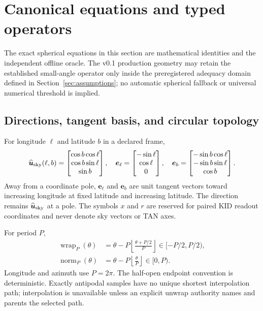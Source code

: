 \section{Canonical equations and typed operators}
\label{sec:equations}

The exact spherical equations in this section are mathematical identities and
the independent offline oracle.  The v0.1 production geometry may retain the
established small-angle operator only inside the preregistered adequacy domain
defined in Section~\ref{sec:assumptions}; no automatic spherical fallback or
universal numerical threshold is implied.

\subsection{Directions, tangent basis, and circular topology}

For longitude $\ell$ and latitude $b$ in a declared frame,
\begin{equation}
 \widehat{\boldsymbol u}_{\rm sky}(\ell,b)=
 \begin{bmatrix}\cos b\cos\ell\\ \cos b\sin\ell\\ \sin b\end{bmatrix},
 \quad
 \boldsymbol e_\ell=
 \begin{bmatrix}-\sin\ell\\ \cos\ell\\0\end{bmatrix},
 \quad
 \boldsymbol e_b=
 \begin{bmatrix}-\sin b\cos\ell\\-\sin b\sin\ell\\\cos b\end{bmatrix}.
 \label{eq:unit-basis}
\end{equation}
Away from a coordinate pole, $\boldsymbol e_\ell$ and $\boldsymbol e_b$ are
unit tangent vectors toward increasing longitude at fixed latitude and
increasing latitude.  The direction remains
$\widehat{\boldsymbol u}_{\rm sky}$ at a pole.  The symbols $x$ and $r$ are
reserved for paired KID readout coordinates and never denote sky vectors or
TAN axes.

For period $P$,
\begin{align}
 \operatorname{wrap}_P(\theta)
 &=\theta-P\left\lfloor\frac{\theta+P/2}{P}\right\rfloor
   \in[-P/2,P/2),\label{eq:wrap}\\
 \operatorname{norm}_P(\theta)
 &=\theta-P\left\lfloor\frac{\theta}{P}\right\rfloor
   \in[0,P).\label{eq:norm}
\end{align}
Longitude and azimuth use $P=2\pi$.  The half-open endpoint convention is
deterministic.  Exactly antipodal samples have no unique shortest interpolation
path; interpolation is unavailable unless an explicit unwrap authority names
and parents the selected path.

